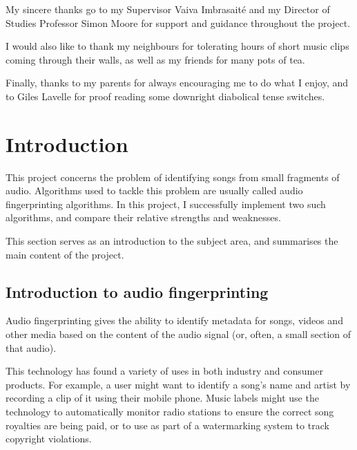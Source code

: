 \documentclass[12pt,a4paper,twoside,openright]{report}
\begin{document}
My sincere thanks go to my Supervisor Vaiva Imbrasait\'{e} and my Director of Studies Professor Simon Moore for support and guidance throughout the project.

I would also like to thank my neighbours for tolerating hours of short music clips coming through their walls, as well as my friends for many pots of tea.

Finally, thanks to my parents for always encouraging me to do what I enjoy, and to Giles Lavelle for proof reading some downright diabolical tense switches.


\tableofcontents




\pagestyle{headings}



\chapter{Introduction}
\label{introduction}

This project concerns the problem of identifying songs from small fragments of audio. Algorithms used to tackle this problem are usually called audio fingerprinting algorithms. In this project, I successfully implement two such algorithms, and compare their relative strengths and weaknesses.

This section serves as an introduction to the subject area, and summarises the main content of the project.

\section{Introduction to audio fingerprinting}

Audio fingerprinting gives the ability to identify metadata for songs, videos and other media based on the content of the audio signal (or, often, a small section of that audio).

This technology has found a variety of uses in both industry and consumer products. For example, a user might want to identify a song's name and artist by recording a clip of it using their mobile phone. Music labels might use the technology to automatically monitor radio stations to ensure the correct song royalties are being paid, or to use as part of a watermarking system to track copyright violations.
\end{document}

